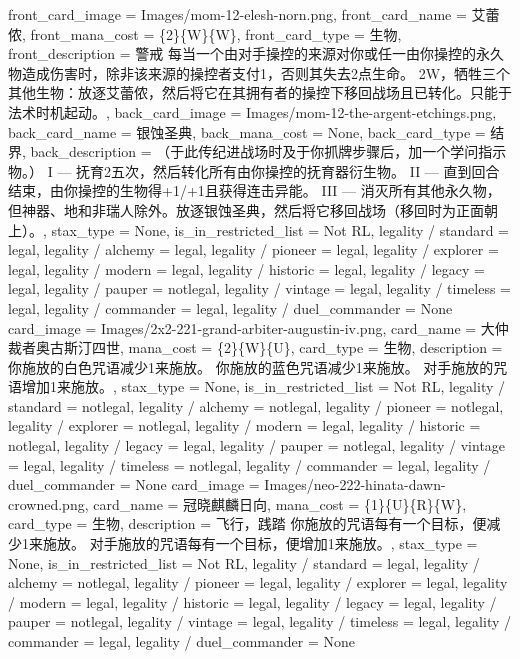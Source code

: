 \documentclass[lang = cn, color = black, 10pt]{AllThatStax}
\begin{document}
\mfcard
{
	front_card_image = Images/mom-12-elesh-norn.png,
	front_card_name = 艾蕾侬,
	front_mana_cost = \{2\}\{W\}\{W\},
	front_card_type = 生物,
	front_description = 警戒
	每当一个由对手操控的来源对你或任一由你操控的永久物造成伤害时，除非该来源的操控者支付{1}，否则其失去2点生命。
	{2}{W}，牺牲三个其他生物：放逐艾蕾侬，然后将它在其拥有者的操控下移回战场且已转化。只能于法术时机起动。,
	back_card_image = Images/mom-12-the-argent-etchings.png,
	back_card_name = 银蚀圣典,
	back_mana_cost = None,
	back_card_type = 结界,
	back_description = （于此传纪进战场时及于你抓牌步骤后，加一个学问指示物。）
	I — 抚育2五次，然后转化所有由你操控的抚育器衍生物。
	II — 直到回合结束，由你操控的生物得+1/+1且获得连击异能。
	III — 消灭所有其他永久物，但神器、地和非瑞人除外。放逐银蚀圣典，然后将它移回战场（移回时为正面朝上）。,
	stax_type = None,
	is_in_restricted_list = Not RL,
	legality / standard = legal,
	legality / alchemy = legal,
	legality / pioneer = legal,
	legality / explorer = legal,
	legality / modern = legal,
	legality / historic = legal,
	legality / legacy = legal,
	legality / pauper = notlegal,
	legality / vintage = legal,
	legality / timeless = legal,
	legality / commander = legal,
	legality / duel_commander = None
}
\card
{
	card_image = Images/2x2-221-grand-arbiter-augustin-iv.png,
	card_name = 大仲裁者奥古斯汀四世,
	mana_cost = \{2\}\{W\}\{U\},
	card_type = 生物,
	description = 你施放的白色咒语减少{1}来施放。
	你施放的蓝色咒语减少{1}来施放。
	对手施放的咒语增加{1}来施放。,
	stax_type = None,
	is_in_restricted_list = Not RL,
	legality / standard = notlegal,
	legality / alchemy = notlegal,
	legality / pioneer = notlegal,
	legality / explorer = notlegal,
	legality / modern = legal,
	legality / historic = notlegal,
	legality / legacy = legal,
	legality / pauper = notlegal,
	legality / vintage = legal,
	legality / timeless = notlegal,
	legality / commander = legal,
	legality / duel_commander = None
}
\card
{
	card_image = Images/neo-222-hinata-dawn-crowned.png,
	card_name = 冠晓麒麟日向,
	mana_cost = \{1\}\{U\}\{R\}\{W\},
	card_type = 生物,
	description = 飞行，践踏
	你施放的咒语每有一个目标，便减少{1}来施放。
	对手施放的咒语每有一个目标，便增加{1}来施放。,
	stax_type = None,
	is_in_restricted_list = Not RL,
	legality / standard = legal,
	legality / alchemy = notlegal,
	legality / pioneer = legal,
	legality / explorer = legal,
	legality / modern = legal,
	legality / historic = legal,
	legality / legacy = legal,
	legality / pauper = notlegal,
	legality / vintage = legal,
	legality / timeless = legal,
	legality / commander = legal,
	legality / duel_commander = None
}
\end{document}
